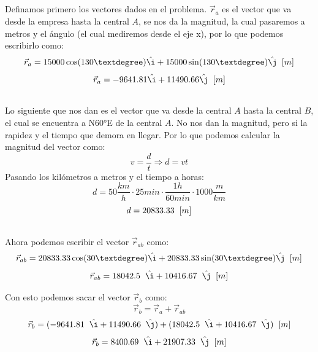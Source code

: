 \documentclass[
  letterpaper,
  DIV=11,
  numbers=noendperiod]{scrartcl}
\begin{document}
\subsection{}\label{section}

Definamos primero los vectores dados en el problema. \(\vec{r}_a\) es el
vector que va desde la empresa hasta la central \(A\), se nos da la
magnitud, la cual pasaremos a metros y el ángulo (el cual mediremos
desde el eje x), por lo que podemos escribirlo como: \[
\vec{r}_a = 15000 \cos(130°) \hat{ı} + 15000 \sin(130°) \hat{ȷ} \hspace{0.2cm} [m]
\] \[
\vec{r}_a = -9641.81 \hat{ı} + 11490.66 \hat{ȷ} \hspace{0.2cm} [m]
\]

\subsection{}\label{section-1}

Lo siguiente que nos dan es el vector que va desde la central \(A\)
hasta la central \(B\), el cual se encuentra a N60°E de la central
\(A\). No nos dan la magnitud, pero si la rapidez y el tiempo que demora
en llegar. Por lo que podemos calcular la magnitud del vector como: \[
v = \frac{d}{t} \Rightarrow d = v t
\] Pasando los kilómetros a metros y el tiempo a horas: \[
d = 50 \frac{km}{h} \cdot 25 min \cdot \frac{1 h}{60 min} \cdot 1000 \frac{m}{km}
\] \[
d = 20833.33 \hspace{0.2cm} [m]
\]

\subsection{}\label{section-2}

Ahora podemos escribir el vector \(\vec{r}_{ ab }\) como: \[
\vec{r}_{ab} = 20833.33 \cos(30°) \hat{ı} + 20833.33 \sin(30°) \hat{ȷ} \hspace{0.2cm} [m]
\] \[
\vec{r}_{ab} = 18042.5 \hspace{0.2cm} \hat{ı} + 10416.67 \hspace{0.2cm} \hat{ȷ} \hspace{0.2cm} [m]
\]

Con esto podemos sacar el vector \(\vec{r}_b\) como: \[
\vec{r}_b = \vec{r}_a + \vec{r}_{ab}
\] \[
\vec{r}_b = (-9641.81 \hspace{0.2cm} \hat{ı} + 11490.66 \hspace{0.2cm} \hat{ȷ}) + (18042.5 \hspace{0.2cm} \hat{ı} + 10416.67 \hspace{0.2cm} \hat{ȷ}) \hspace{0.2cm} [m]
\] \[
\vec{r}_b = 8400.69 \hspace{0.2cm} \hat{ı} + 21907.33 \hspace{0.2cm} \hat{ȷ} \hspace{0.2cm} [m]
\]
\end{document}
